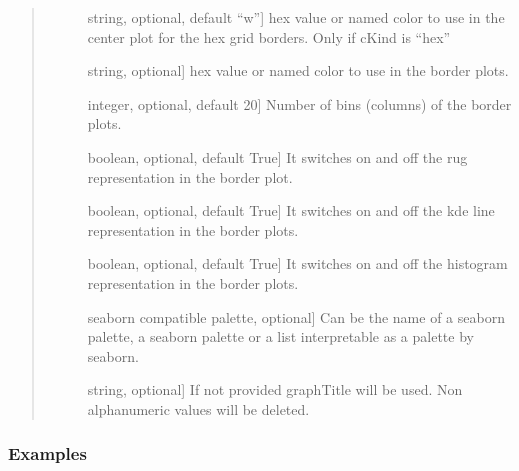 \documentclass[letterpaper,10pt,english]{sphinxmanual}
\begin{document}
\begin{fulllineitems}
\begin{quote}
\begin{description}
\begin{description}
\item[{}] \leavevmode{[}string, optional, default “w”{]}
hex value or named color to use in the center plot 
for the hex grid borders. Only if cKind is “hex”

\item[{}] \leavevmode{[}string, optional{]}
hex value or named color to use in the border plots.

\item[{}] \leavevmode{[}integer, optional, default 20{]}
Number of bins (columns) of the border plots.

\item[{}] \leavevmode{[}boolean, optional, default True{]}
It switches on and off the rug representation in the border plot.

\item[{}] \leavevmode{[}boolean, optional, default True{]}
It switches on and off the kde line representation in the border plots.

\item[{}] \leavevmode{[}boolean, optional, default True{]}
It switches on and off the histogram representation in the border plots.

\item[{}] \leavevmode{[}seaborn compatible palette, optional{]}
Can be the name of a seaborn palette, 
a seaborn palette or a list interpretable 
as a palette by seaborn.

\item[{}] \leavevmode{[}string, optional{]}
If not provided graphTitle will be used. 
Non alphanumeric values will be deleted.

\end{description}

\end{description}\end{quote}
\subsubsection*{Examples}


\end{fulllineitems}
\end{document}
